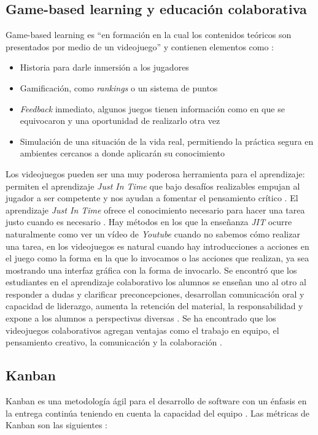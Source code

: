 \subsection{Game-based learning y educación colaborativa}
Game-based learning es “en formación en la cual los contenidos teóricos son presentados por medio de un videojuego” \cite{gamelearn2014a} y contienen elementos como \cite{gamelearn2017a}:
\begin{itemize}
    \item Historia para darle inmersión a los jugadores
    \item Gamificación, como \textit{rankings} o un sistema de puntos
    \item \textit{Feedback} inmediato, algunos juegos tienen información como en que se equivocaron y una oportunidad de realizarlo otra vez
    \item Simulación de una situación de la vida real, permitiendo la práctica segura en ambientes cercanos a donde aplicarán su conocimiento
\end{itemize}

Los videojuegos pueden ser una muy poderosa herramienta para el aprendizaje: permiten el aprendizaje \textit{Just In Time} que bajo desafíos realizables empujan al 
jugador a ser competente y nos ayudan a fomentar el pensamiento crítico \cite{levasseur-a}. 
El aprendizaje \textit{Just In Time} ofrece el conocimiento necesario para hacer una tarea justo cuando es necesario \cite{unknown2017a}. 
Hay métodos en los que la enseñanza \textit{JIT} ocurre naturalmente como ver un vídeo de \textit{Youtube} cuando no sabemos cómo realizar una tarea, 
en los videojuegos es natural cuando hay introducciones a acciones en el juego como la forma en la que lo invocamos o las acciones que realizan, 
ya sea mostrando una interfaz gráfica con la forma de invocarlo.
Se encontró que los estudiantes en el aprendizaje colaborativo los alumnos se enseñan uno al otro al responder a dudas y 
clarificar preconcepciones, desarrollan comunicación oral y capacidad de liderazgo, aumenta la retención del material, 
la responsabilidad y expone a los alumnos a perspectivas diversas \cite{university-a}.
Se ha encontrado que los videojuegos colaborativos agregan ventajas como el trabajo en equipo, el pensamiento creativo, 
la comunicación y la colaboración \cite{romano-a}.

\subsection{Kanban}
Kanban es una metodología ágil para el desarrollo de software con un énfasis 
en la entrega continúa teniendo en cuenta la capacidad del equipo \cite{romano-a}. 
Las métricas de Kanban son las siguientes \cite{najera2018a}:

